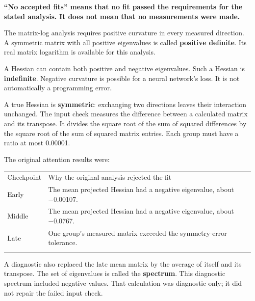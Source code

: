 \documentclass[
  14pt,
  letterpaper,
]{extarticle}
\newcounter{none} %
\begin{document}
\textbf{``No accepted fits'' means that no fit passed the requirements
for the stated analysis. It does not mean that no measurements were
made.}

The matrix-log analysis requires positive curvature in every measured
direction. A symmetric matrix with all positive eigenvalues is called
\textbf{positive definite}. Its real matrix logarithm is available for
this analysis.

A Hessian can contain both positive and negative eigenvalues. Such a
Hessian is \textbf{indefinite}. Negative curvature is possible for a
neural network's loss. It is not automatically a programming error.

A true Hessian is \textbf{symmetric}: exchanging two directions leaves
their interaction unchanged. The input check measures the difference
between a calculated matrix and its transpose. It divides the square
root of the sum of squared differences by the square root of the sum of
squared matrix entries. Each group must have a ratio at most 0.00001.

The original attention results were:

{\def\LTcaptype{none} %
\begin{longtable}[]{@{}
  >{\raggedright\arraybackslash}p{}
  >{\raggedright\arraybackslash}p{}@{}}
\toprule\noalign{}
\begin{minipage}[b]{\linewidth}\raggedright
Checkpoint
\end{minipage} & \begin{minipage}[b]{\linewidth}\raggedright
Why the original analysis rejected the fit
\end{minipage} \\*
\midrule\noalign{}
\endhead
\bottomrule\noalign{}
\endlastfoot
Early & The mean projected Hessian had a negative eigenvalue, about
−0.00107. \\*
Middle & The mean projected Hessian had a negative eigenvalue, about
−0.0767. \\*
Late & One group's measured matrix exceeded the symmetry-error
tolerance. \\*
\end{longtable}
}

A diagnostic also replaced the late mean matrix by the average of itself
and its transpose. The set of eigenvalues is called the
\textbf{spectrum}. This diagnostic spectrum included negative values.
That calculation was diagnostic only; it did not repair the failed input
check.
\end{document}
